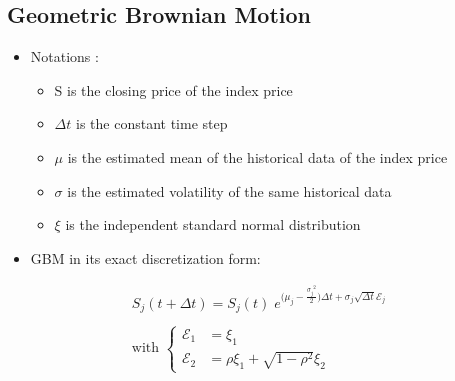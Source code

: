 \subsection{Geometric Brownian Motion}
\begin{frame}
\myframetitle{}
\begin{itemize}
  \item Notations :
	\begin{itemize}
		\item S is the closing price of the index price%
		\item $\Delta t$ is the constant time step%
		\item $\mu$ is the estimated mean of the historical data of the index price
		\item $\sigma$ is the estimated volatility of the same historical data
		\item $\xi$ is the independent standard normal distribution
	\end{itemize}
	\item GBM in its exact discretization form:
\end{itemize}
\begin{gather*}
	S_j(t+\Delta t) = S_j(t) \;
		e^{\bigl(\mu_j-\frac{{\sigma_j}^2}{2}\bigr)\Delta t+\sigma_j \sqrt{\Delta t}\mathcal{E}_j} 
	\\
	\\
	\mbox{with }
	\left \{
	\begin{array}{ll}
    \mathcal{E}_1 & = \xi_1 \\
    \mathcal{E}_2 & = \rho\xi_1 + \sqrt{1-\rho^2}\xi_2
  \end{array}
	\right.
\end{gather*}

\end{frame}

